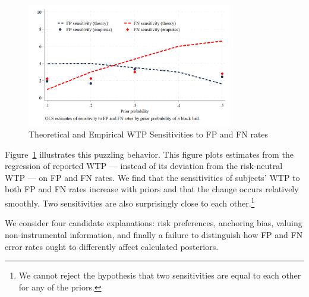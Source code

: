 \documentclass[12pt,a4paper]{article}
\begin{document}
\begin{figure}[H]
\centering
\caption{Theoretical and Empirical WTP Sensitivities to FP and FN rates} \label{fig:Comparison}
\includegraphics[width=0.8\textwidth]{Graphs/sensit_comparison.png}
\end{figure}

Figure~\ref{fig:Comparison} illustrates this puzzling behavior. This figure plots estimates from the regression of reported WTP --- instead of its deviation from the risk-neutral WTP --- on FP and FN rates. We find that the sensitivities of subjects' WTP to both FP and FN rates increase with priors and that the change occurs relatively smoothly. Two sensitivities are also surprisingly close to each other.\footnote{We cannot reject the hypothesis that two sensitivities are equal to each other for any of the priors.} 

We consider four candidate explanations: risk preferences, anchoring bias, valuing non-instrumental information, and finally a failure to distinguish how FP and FN error rates ought to differently affect calculated posteriors. 

\end{document}
